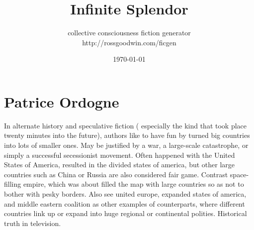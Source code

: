 \documentclass[12pt]{book}
\title{Infinite Splendor}
\author{collective consciousness fiction generator\\http://rossgoodwin.com/ficgen}
\date{\today}
\begin{document}
\maketitle



\chapter{Patrice Ordogne}

In alternate history and speculative fiction ( especially the kind that took place twenty minutes into the future), authors like to have fun by turned big countries into lots of smaller ones. May be justified by a war, a large-scale catastrophe, or simply a successful secessionist movement. Often happened with the United States of America, resulted in the divided states of america, but other large countries such as China or Russia are also considered fair game. Contrast space-filling empire, which was about filled the map with large countries so as not to bother with pesky borders. Also see united europe, expanded states of america, and middle eastern coalition as other examples of counterparts, where different countries link up or expand into huge regional or continental polities. Historical truth in television.
\end{document}
